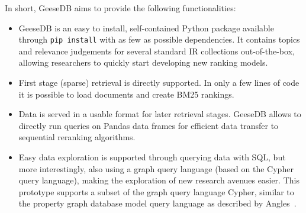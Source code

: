 In short, GeeseDB aims to provide the following functionalities:
\begin{itemize}
	\item GeeseDB is an easy to install, self-contained Python package available through \texttt{pip install} with as few as possible dependencies. It contains topics and relevance judgements for several standard IR collections out-of-the-box, allowing researchers to quickly start developing new ranking models. 
	\item First stage (sparse) retrieval is directly supported. In only a few lines of code it is possible to load documents and create BM25 rankings. 
	\item Data is served in a usable format for later retrieval stages. GeeseDB allows to directly run queries on Pandas data frames for efficient data transfer to sequential reranking algorithms.
	\item Easy data exploration is supported through querying data with SQL, but more interestingly, also using a graph query language (based on the Cypher query language), making the exploration of new research avenues easier. This prototype supports a subset of the graph query language Cypher, similar to the property graph database model query language as described by Angles~\cite{angles2018property}.
\end{itemize}

